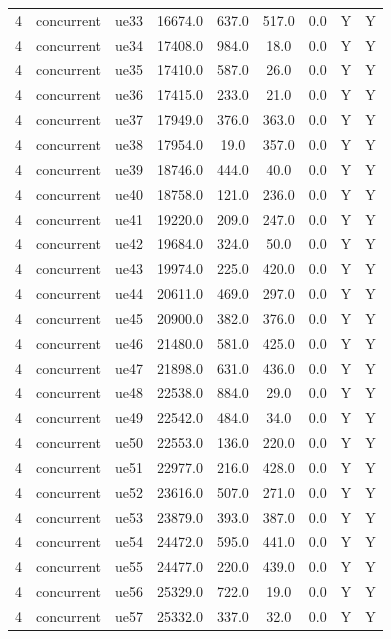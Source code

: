 \begin{table}[ht]
\begin{tabular}{|c|c|c|c|c|c|c|c|c|}
4 & concurrent & ue33 & 16674.0 & 637.0 & 517.0 & 0.0 & Y & Y \\
4 & concurrent & ue34 & 17408.0 & 984.0 & 18.0 & 0.0 & Y & Y \\
4 & concurrent & ue35 & 17410.0 & 587.0 & 26.0 & 0.0 & Y & Y \\
4 & concurrent & ue36 & 17415.0 & 233.0 & 21.0 & 0.0 & Y & Y \\
4 & concurrent & ue37 & 17949.0 & 376.0 & 363.0 & 0.0 & Y & Y \\
4 & concurrent & ue38 & 17954.0 & 19.0 & 357.0 & 0.0 & Y & Y \\
4 & concurrent & ue39 & 18746.0 & 444.0 & 40.0 & 0.0 & Y & Y \\
4 & concurrent & ue40 & 18758.0 & 121.0 & 236.0 & 0.0 & Y & Y \\
4 & concurrent & ue41 & 19220.0 & 209.0 & 247.0 & 0.0 & Y & Y \\
4 & concurrent & ue42 & 19684.0 & 324.0 & 50.0 & 0.0 & Y & Y \\
4 & concurrent & ue43 & 19974.0 & 225.0 & 420.0 & 0.0 & Y & Y \\
4 & concurrent & ue44 & 20611.0 & 469.0 & 297.0 & 0.0 & Y & Y \\
4 & concurrent & ue45 & 20900.0 & 382.0 & 376.0 & 0.0 & Y & Y \\
4 & concurrent & ue46 & 21480.0 & 581.0 & 425.0 & 0.0 & Y & Y \\
4 & concurrent & ue47 & 21898.0 & 631.0 & 436.0 & 0.0 & Y & Y \\
4 & concurrent & ue48 & 22538.0 & 884.0 & 29.0 & 0.0 & Y & Y \\
4 & concurrent & ue49 & 22542.0 & 484.0 & 34.0 & 0.0 & Y & Y \\
4 & concurrent & ue50 & 22553.0 & 136.0 & 220.0 & 0.0 & Y & Y \\
4 & concurrent & ue51 & 22977.0 & 216.0 & 428.0 & 0.0 & Y & Y \\
4 & concurrent & ue52 & 23616.0 & 507.0 & 271.0 & 0.0 & Y & Y \\
4 & concurrent & ue53 & 23879.0 & 393.0 & 387.0 & 0.0 & Y & Y \\
4 & concurrent & ue54 & 24472.0 & 595.0 & 441.0 & 0.0 & Y & Y \\
4 & concurrent & ue55 & 24477.0 & 220.0 & 439.0 & 0.0 & Y & Y \\
4 & concurrent & ue56 & 25329.0 & 722.0 & 19.0 & 0.0 & Y & Y \\
4 & concurrent & ue57 & 25332.0 & 337.0 & 32.0 & 0.0 & Y & Y \\

\end{tabular}
\end{table}
